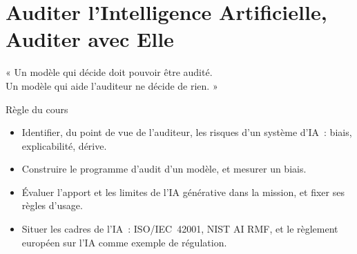 
\chapter{Auditer l'Intelligence Artificielle, Auditer avec Elle}
\label{chap:audit-ia}

\epigraph{%
    « Un modèle qui décide doit pouvoir être audité.\\
    Un modèle qui aide l'auditeur ne décide de rien. »%
}{Règle du cours}


\begin{boxobjectifs}
\begin{itemize}
    \item Identifier, du point de vue de l'auditeur, les risques d'un
          système d'IA~: biais, explicabilité, dérive.
    \item Construire le programme d'audit d'un modèle, et mesurer un biais.
    \item Évaluer l'apport et les limites de l'IA générative dans la
          mission, et fixer ses règles d'usage.
    \item Situer les cadres de l'IA~: ISO/IEC~42001, NIST AI RMF, et le
          règlement européen sur l'IA comme exemple de régulation.
\end{itemize}
\end{boxobjectifs}

